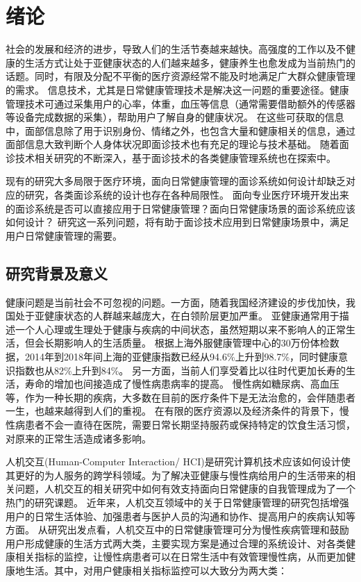 \chapter{绪论}

社会的发展和经济的进步，导致人们的生活节奏越来越快。高强度的工作以及不健康的生活方式让处于亚健康状态的人们越来越多，健康养生也愈发成为当前热门的话题。同时，有限及分配不平衡的医疗资源经常不能及时地满足广大群众健康管理的需求\cite{雷鹏2019中国医疗资源配置与服务利用现状评价}。
信息技术，尤其是日常健康管理技术是解决这一问题的重要途径。健康管理技术可通过采集用户的心率，体重，血压等信息（通常需要借助额外的传感器等设备完成数据的采集），帮助用户了解自身的健康状况。
在这些可获取的信息中，面部信息除了用于识别身份、情绪之外，也包含大量和健康相关的信息，通过面部信息大致判断个人身体状况即面诊技术也有充足的理论与技术基础\cite{li2020tcminet}。
随着面诊技术相关研究的不断深入，基于面诊技术的各类健康管理系统也在探索中\cite{林锋2019中医面诊系统调研报告}。

现有的研究大多局限于医疗环境，面向日常健康管理的面诊系统如何设计却缺乏对应的研究，各类面诊系统的设计也存在各种局限性。
面向专业医疗环境开发出来的面诊系统是否可以直接应用于日常健康管理？面向日常健康场景的面诊系统应该如何设计？
研究这一系列问题，将有助于面诊技术应用到日常健康场景中，满足用户日常健康管理的需要。

\section{研究背景及意义}
健康问题是当前社会不可忽视的问题。一方面，随着我国经济建设的步伐加快，我国处于亚健康状态的人群越来越庞大，在白领阶层更加严重。
亚健康通常用于描述一个人心理或生理处于健康与疾病的中间状态，虽然短期以来不影响人的正常生活，但会长期影响人的生活质量。
根据上海外服健康管理中心的30万份体检数据，2014年到2018年间上海的亚健康指数已经从94.6\%上升到98.7\%，同时健康意识指数也从82\%上升到84\%\cite{health_report2019}。
另一方面，当前人们享受着比以往时代更加长寿的生活，寿命的增加也间接造成了慢性病患病率的提高\cite{OlshanskyDEMOGRAPHY}。
慢性病如糖尿病、高血压等，作为一种长期的疾病，大多数在目前的医疗条件下是无法治愈的，会伴随患者一生，也越来越得到人们的重视\cite{blandford2019hci}。
在有限的医疗资源以及经济条件的背景下，慢性病患者不会一直待在医院，需要日常长期坚持服药或保持特定的饮食生活习惯，对原来的正常生活造成诸多影响\cite{lupton2017self-tracking}。

人机交互(Human-Computer Interaction/ HCI)是研究计算机技术应该如何设计使其更好的为人服务的跨学科领域。为了解决亚健康与慢性病给用户的生活带来的相关问题，人机交互的相关研究中如何有效支持面向日常健康的自我管理成为了一个热门的研究课题。
近年来，人机交互领域中的关于日常健康管理的研究包括增强用户的日常生活体验、加强患者与医护人员的沟通和协作、提高用户的疾病认知等方面。
从研究出发点看，人机交互中的日常健康管理可分为慢性疾病管理和鼓励用户形成健康的生活方式两大类，主要实现方案是通过合理的系统设计、对各类健康相关指标的监控，让慢性病患者可以在日常生活中有效管理慢性病，从而更加健康地生活。其中，对用户健康相关指标监控可以大致分为两大类：

